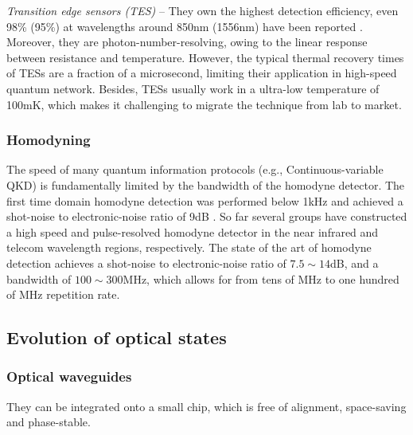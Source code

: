 \documentclass[aps, rmp, twocolumn, amsmath, amssymb, nofootinbib, superscriptaddress, longbibliography, floatfix, table-of-contents, eqsecnum]{revtex4-1}
\begin{document}
\textit{Transition edge sensors (TES)} -- They own the highest detection efficiency, even 98\% (95\%) at wavelengths around 850nm (1556nm) have been reported \cite{fukuda2011, lita2008}. Moreover, they are photon-number-resolving, owing to the linear response between resistance and temperature. However, the typical thermal recovery times of TESs are a fraction of a microsecond, limiting their application in high-speed quantum network. Besides, TESs usually work in a ultra-low temperature of 100mK, which makes it challenging to migrate the technique from lab to market.

%
%

\subsubsection{Homodyning} 

The speed of many quantum information protocols (e.g., Continuous-variable QKD) is fundamentally limited by the bandwidth of the homodyne detector. The first time domain homodyne detection was performed below 1kHz and achieved a shot-noise to electronic-noise ratio of 9dB \cite{winzer2010}. So far several groups \cite{zavatta2002time, okubo2008pulse, kumar2012versatile, chi2011balanced, duan2013} have constructed a high speed and pulse-resolved homodyne detector in the near infrared and telecom wavelength regions, respectively. The state of the art of homodyne detection achieves a shot-noise to electronic-noise ratio of \mbox{$7.5\sim 14$dB}, and a bandwidth of \mbox{$100\sim 300$MHz}, which allows for from tens of MHz to one hundred of MHz repetition rate.

%
%

\subsection{Evolution of optical states}  \label{sec:LO_evolution}

%
%

\subsubsection{Optical waveguides} 

They can be integrated onto a small chip, which is free of alignment, space-saving and phase-stable.
\end{document}
